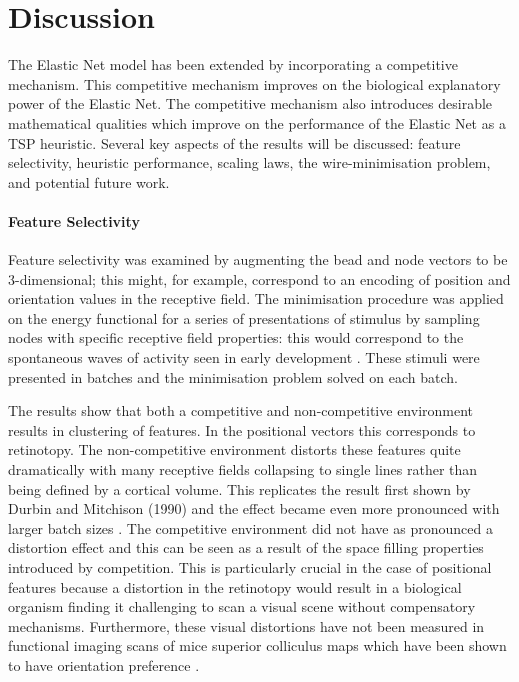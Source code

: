 \newpage
\section{Discussion}
The Elastic Net model has been extended by incorporating a competitive mechanism. This competitive mechanism improves on the biological explanatory power of the Elastic Net. The competitive mechanism also introduces desirable mathematical qualities which improve on the performance of the Elastic Net as a TSP heuristic. Several key aspects of the results will be discussed: feature selectivity, heuristic performance, scaling laws, the wire-minimisation problem, and potential future work.
\paragraph{Feature Selectivity} 
Feature selectivity was examined by augmenting the bead and node vectors to be 3-dimensional; this might, for example, correspond to an encoding of position and orientation values in the receptive field. The minimisation procedure was applied on the energy functional for a series of presentations of stimulus by sampling nodes with specific receptive field properties: this would correspond to the spontaneous waves of activity seen in early development \cite{Meister1991-mu, Burbridge2014-ib}. These stimuli were presented in batches and the minimisation problem solved on each batch. 

The results show that both a competitive and non-competitive environment results in clustering of features. In the positional vectors this corresponds to retinotopy. The non-competitive environment distorts these features quite dramatically with many receptive fields collapsing to single lines rather than being defined by a cortical volume. This replicates the result first shown by Durbin and Mitchison (1990) and the effect became even more pronounced with larger batch sizes \cite{Durbin1990-tn}. The competitive environment did not have as pronounced a distortion effect and this can be seen as a result of the space filling properties introduced by competition. This is particularly crucial in the case of positional features because a distortion in the retinotopy would result in a biological organism finding it challenging to scan a visual scene without compensatory mechanisms. Furthermore, these visual distortions have not been measured in functional imaging scans of mice superior colliculus maps which have been shown to have orientation preference \cite{Cang2005-eg, Feinberg2015-eu}. 

